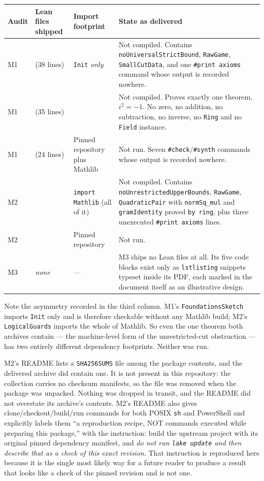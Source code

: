 \documentclass[11pt,letterpaper]{article}
\numberwithin{equation}{section}
\theoremstyle{definition}
\theoremstyle{remark}
\begin{document}
{\small
\begin{longtable}{@{}P{0.08\textwidth}P{0.25\textwidth}P{0.20\textwidth}P{0.34\textwidth}@{}}
\toprule
Audit & Lean files shipped & Import footprint & State as delivered\\
\midrule\endhead
M1 &  (38 lines)
   & \texttt{Init} \emph{only}
   & Not compiled. Contains \texttt{noUniversalStrictBound}, \texttt{RawGame},
     \texttt{SmallCutData}, and one \texttt{\#print axioms} command whose output
     is recorded nowhere.\\[0.4em]
M1 &  (35 lines)
   & 
   & Not compiled. Proves exactly one theorem, $i^2=-1$. No zero, no addition,
     no subtraction, no inverse, no \texttt{Ring} and no \texttt{Field} instance.\\[0.4em]
M1 &  (24 lines)
   & Pinned repository plus Mathlib
   & Not run. Seven \texttt{\#check}/\texttt{\#synth} commands whose output is
     recorded nowhere.\\[0.4em]
M2 & 
   & \texttt{import Mathlib} (all of it)
   & Not compiled. Contains \texttt{noUnrestrictedUpperBounds}, \texttt{RawGame},
     \texttt{QuadraticPair} with \texttt{normSq\_mul} and \texttt{gramIdentity}
     proved \texttt{by ring}, plus three unexecuted \texttt{\#print axioms} lines.\\[0.4em]
M2 & 
   & Pinned repository
   & Not run.\\[0.4em]
M3 & \emph{none}
   & ---
   & M3 ships no Lean files at all. Its five code blocks exist only as
     \texttt{lstlisting} snippets typeset inside its PDF, each marked in the
     document itself as an illustrative design.\\
\bottomrule
\end{longtable}
}

Note the asymmetry recorded in the third column. M1's \texttt{FoundationsSketch}
imports \texttt{Init} only and is therefore checkable without any Mathlib build;
M2's \texttt{LogicalGuards} imports the whole of Mathlib. So even the one
theorem both archives contain --- the machine-level form of the unrestricted-cut
obstruction --- has two entirely different dependency footprints. Neither was
run.

M2's README lists a \texttt{SHA256SUMS} file among the package contents, and
the delivered archive did contain one. It is not present in this repository:
the collection carries no checksum manifests, so the file was removed when the
package was unpacked. Nothing was dropped in transit, and the README did not
overstate its archive's contents. M2's README also gives clone/checkout/build/run commands for
both POSIX \texttt{sh} and PowerShell and explicitly labels them ``a
reproduction recipe, NOT commands executed while preparing this package,'' with
the instruction: build the upstream project with its original pinned dependency
manifest, and \emph{do not run \texttt{lake update} and then describe that as a
check of this exact revision}. That instruction is reproduced here because it
is the single most likely way for a future reader to produce a result that
looks like a check of the pinned revision and is not one.
\end{document}
